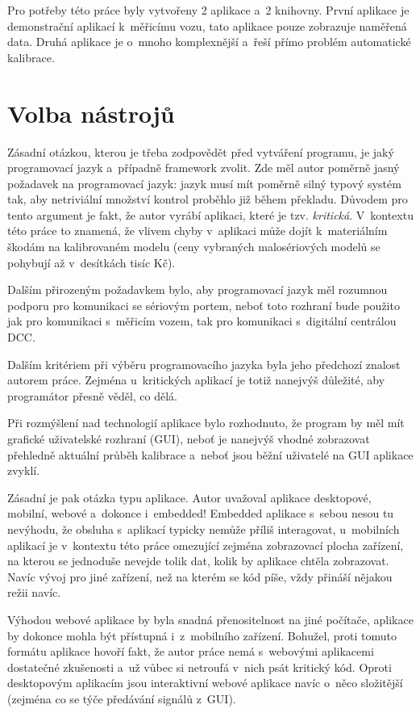 Pro potřeby této práce byly vytvořeny 2 aplikace a~2 knihovny. První aplikace je
demonstrační aplikací k~měřicímu vozu, tato aplikace pouze zobrazuje naměřená
data. Druhá aplikace je o~mnoho komplexnější a~řeší přímo problém automatické
kalibrace.

\section{Volba nástrojů}
\label{sec:sw-nastroje}

Zásadní otázkou, kterou je třeba zodpovědět před vytváření programu, je
jaký programovací jazyk a~případně framework zvolit. Zde měl autor poměrně
jasný požadavek na programovací jazyk: jazyk musí mít poměrně silný typový
systém tak, aby netriviální množství kontrol proběhlo již během překladu.
Důvodem pro tento argument je fakt, že autor vyrábí aplikaci, které je tzv.
\textit{kritická}. V~kontextu této práce to znamená, že vlivem chyby
v~aplikaci může dojít k~materiálním škodám na kalibrovaném modelu (ceny
vybraných malosériových modelů se pohybují až v~desítkách tisíc Kč).

Dalším přirozeným požadavkem bylo, aby programovací jazyk měl rozumnou podporu
pro komunikaci se sériovým portem, neboť toto rozhraní bude použito jak pro
komunikaci s~měřicím vozem, tak pro komunikaci s~digitální centrálou DCC.

Dalším kritériem při výběru programovacího jazyka byla jeho předchozí znalost
autorem práce. Zejména u~kritických aplikací je totiž nanejvýš důležité, aby
programátor přesně věděl, co dělá.

Při rozmýšlení nad technologií aplikace bylo rozhodnuto, že program by měl
mít grafické uživatelské rozhraní (GUI), neboť je nanejvýš vhodné zobrazovat
přehledně aktuální průběh kalibrace a~neboť jsou běžní uživatelé na GUI
aplikace zvyklí.

Zásadní je pak otázka typu aplikace. Autor uvažoval aplikace desktopové,
mobilní, webové a~dokonce i~embedded! Embedded aplikace s~sebou nesou tu
nevýhodu, že obsluha s~aplikací typicky nemůže příliš interagovat, u~mobilních
aplikací je v~kontextu této práce omezující zejména zobrazovací plocha
zařízení, na kterou se jednoduše nevejde tolik dat, kolik by aplikace chtěla
zobrazovat. Navíc vývoj pro jiné zařízení, než na kterém se kód píše, vždy
přináší nějakou režii navíc.

Výhodou webové aplikace by byla snadná přenositelnost na jiné počítače,
aplikace by dokonce mohla být přístupná i~z~mobilního zařízení. Bohužel, proti
tomuto formátu aplikace hovoří fakt, že autor práce nemá s~webovými aplikacemi
dostatečné zkušenosti a~už vůbec si netroufá v~nich psát kritický kód.
Oproti desktopovým aplikacím jsou interaktivní webové aplikace navíc o~něco
složitější (zejména co se týče předávání signálů z~GUI).

